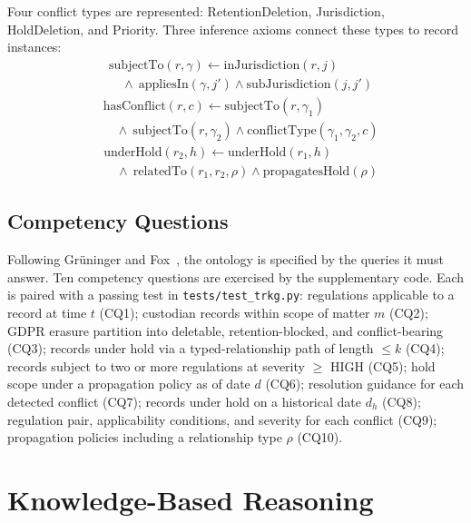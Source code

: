\documentclass{ieeeaccess}
\begin{document}
Four conflict types are represented: RetentionDeletion, Jurisdiction, HoldDeletion, and Priority. Three inference axioms connect these types to record instances:
\begin{align}
&\mathrm{subjectTo}(r, \gamma) \leftarrow \mathrm{inJurisdiction}(r, j) \nonumber \\
&\quad \wedge\ \mathrm{appliesIn}(\gamma, j') \wedge \mathrm{subJurisdiction}(j, j') \tag{Ax.~1}
\end{align}
\begin{align}
&\mathrm{hasConflict}(r, c) \leftarrow \mathrm{subjectTo}(r, \gamma_1) \nonumber \\
&\quad \wedge\ \mathrm{subjectTo}(r, \gamma_2) \wedge \mathrm{conflictType}(\gamma_1, \gamma_2, c) \tag{Ax.~2}
\end{align}
\begin{align}
&\mathrm{underHold}(r_2, h) \leftarrow \mathrm{underHold}(r_1, h) \nonumber \\
&\quad \wedge\ \mathrm{relatedTo}(r_1, r_2, \rho) \wedge \mathrm{propagatesHold}(\rho) \tag{Ax.~3}
\end{align}

\subsection{Competency Questions}
\label{sec:cqs}

Following Gr\"{u}ninger and Fox~\cite{gruninger1995}, the ontology is specified by the queries it must answer. Ten competency questions are exercised by the supplementary code. Each is paired with a passing test in \texttt{tests/test\_trkg.py}: regulations applicable to a record at time $t$ (CQ1); custodian records within scope of matter $m$ (CQ2); GDPR erasure partition into deletable, retention-blocked, and conflict-bearing (CQ3); records under hold via a typed-relationship path of length $\leq k$ (CQ4); records subject to two or more regulations at severity $\geq$ HIGH (CQ5); hold scope under a propagation policy as of date $d$ (CQ6); resolution guidance for each detected conflict (CQ7); records under hold on a historical date $d_h$ (CQ8); regulation pair, applicability conditions, and severity for each conflict (CQ9); propagation policies including a relationship type $\rho$ (CQ10).

\section{Knowledge-Based Reasoning}
\end{document}

